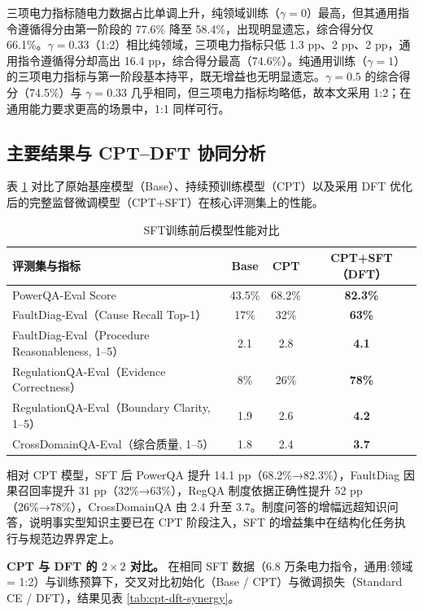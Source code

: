 \documentclass[fontset=fandol,type=master,campus=shenzhen,etitleauto=true]{hithesisbook}
\begin{document}
三项电力指标随电力数据占比单调上升，纯领域训练（$\gamma = 0$）最高，但其通用指令遵循得分由第一阶段的 77.6\% 降至 58.4\%，出现明显遗忘，综合得分仅 66.1\%。$\gamma = 0.33$（1:2）相比纯领域，三项电力指标只低 1.3 pp、2 pp、2 pp，通用指令遵循得分却高出 16.4 pp，综合得分最高（74.6\%）。纯通用训练（$\gamma = 1$）的三项电力指标与第一阶段基本持平，既无增益也无明显遗忘。$\gamma = 0.5$ 的综合得分（74.5\%）与 $\gamma = 0.33$ 几乎相同，但三项电力指标均略低，故本文采用 1:2；在通用能力要求更高的场景中，1:1 同样可行。

\subsection{主要结果与 CPT--DFT 协同分析}\label{ux4e3bux8981ux7ed3ux679c-2}

表 \ref{tab:sft-results} 对比了原始基座模型（Base）、持续预训练模型（CPT）以及采用 DFT 优化后的完整监督微调模型（CPT+SFT）在核心评测集上的性能。

\begin{table}[htbp]
\centering
\caption{SFT训练前后模型性能对比}
\label{tab:sft-results}
\small
\begin{tabular}{l c c c}
\toprule
\textbf{评测集与指标} & \textbf{Base} & \textbf{CPT} & \textbf{CPT+SFT（DFT）} \\
\midrule
PowerQA-Eval Score & 43.5\% & 68.2\% & \textbf{82.3\%} \\
FaultDiag-Eval（Cause Recall Top-1） & 17\% & 32\% & \textbf{63\%} \\
FaultDiag-Eval（Procedure Reasonableness, 1--5） & 2.1 & 2.8 & \textbf{4.1} \\
RegulationQA-Eval（Evidence Correctness） & 8\% & 26\% & \textbf{78\%} \\
RegulationQA-Eval（Boundary Clarity, 1--5） & 1.9 & 2.6 & \textbf{4.2} \\
CrossDomainQA-Eval（综合质量, 1--5） & 1.8 & 2.4 & \textbf{3.7} \\
\bottomrule
\end{tabular}
\end{table}

相对 CPT 模型，SFT 后 PowerQA 提升 14.1 pp（68.2\%→82.3\%），FaultDiag 因果召回率提升 31 pp（32\%→63\%），RegQA 制度依据正确性提升 52 pp（26\%→78\%），CrossDomainQA 由 2.4 升至 3.7。制度问答的增幅远超知识问答，说明事实型知识主要已在 CPT 阶段注入，SFT 的增益集中在结构化任务执行与规范边界界定上。

\textbf{CPT 与 DFT 的 $2 \times 2$ 对比。} 在相同 SFT 数据（6.8 万条电力指令，通用:领域 = 1:2）与训练预算下，交叉对比初始化（Base / CPT）与微调损失（Standard CE / DFT），结果见表 \ref{tab:cpt-dft-synergy}。
\end{document}
